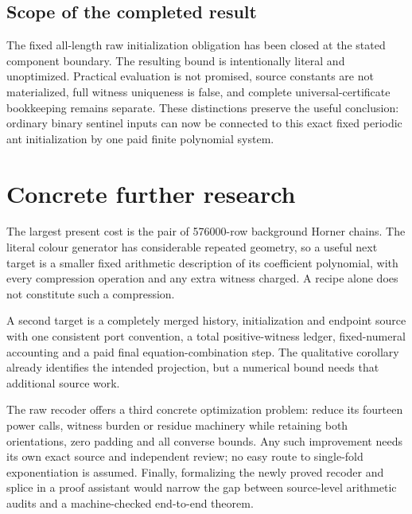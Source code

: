 \documentclass[11pt,letterpaper]{article}
\makeatletter
\theoremstyle{definition}\newtheorem{definition}[theorem]{Definition}
\theoremstyle{remark}\newtheorem{remark}[theorem]{Remark}
\newcommand{\ptrR}{}
\newcommand{\ptrappendix}{%
  \setcounter{section}{0}\def\Hy@chapapp{appendix}%
  \renewcommand{\thesection}{\ptrR.\Alph{section}}%
  \renewcommand{\theHsection}{\ptrR.\Alph{section}}}
\makeatother
\begin{document}
\subsection{Scope of the completed result}
The fixed all-length raw initialization obligation has been closed at the stated component boundary. The resulting bound is intentionally literal and unoptimized. Practical evaluation is not promised, source constants are not materialized, full witness uniqueness is false, and complete universal-certificate bookkeeping remains separate. These distinctions preserve the useful conclusion: ordinary binary sentinel inputs can now be connected to this exact fixed periodic ant initialization by one paid finite polynomial system.

\section{Concrete further research}\label{ptr:ai:sec:future}
The largest present cost is the pair of 576000-row background Horner chains. The literal colour generator has considerable repeated geometry, so a useful next target is a smaller fixed arithmetic description of its coefficient polynomial, with every compression operation and any extra witness charged. A recipe alone does not constitute such a compression.

A second target is a completely merged history, initialization and endpoint source with one consistent port convention, a total positive-witness ledger, fixed-numeral accounting and a paid final equation-combination step. The qualitative corollary already identifies the intended projection, but a numerical bound needs that additional source work.

The raw recoder offers a third concrete optimization problem: reduce its fourteen power calls, witness burden or residue machinery while retaining both orientations, zero padding and all converse bounds. Any such improvement needs its own exact source and independent review; no easy route to single-fold exponentiation is assumed. Finally, formalizing the newly proved recoder and splice in a proof assistant would narrow the gap between source-level arithmetic audits and a machine-checked end-to-end theorem.

\ptrappendix
\end{document}
